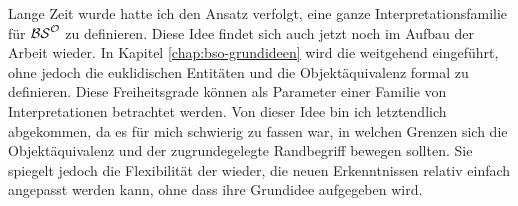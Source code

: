     Lange Zeit
    wurde hatte ich den Ansatz verfolgt, eine ganze Interpretationsfamilie für $\mathcal{BS}^{\mathcal{O}}$ zu definieren.
    Diese Idee findet sich auch jetzt noch im Aufbau der Arbeit wieder.
    In Kapitel \ref{chap:bso-grundideen} wird die \strukt weitgehend eingeführt, ohne jedoch die euklidischen Entitäten und die Objektäquivalenz formal zu definieren.
    Diese Freiheitsgrade können als Parameter einer Familie von Interpretationen betrachtet werden.
    Von dieser Idee bin ich letztendlich abgekommen, da es für mich schwierig zu fassen war, in welchen Grenzen sich die Objektäquivalenz und der zugrundegelegte Randbegriff bewegen sollten.
    Sie spiegelt jedoch die Flexibilität der \strukt wieder, die neuen Erkenntnissen relativ einfach angepasst werden kann, ohne dass ihre Grundidee aufgegeben wird.

